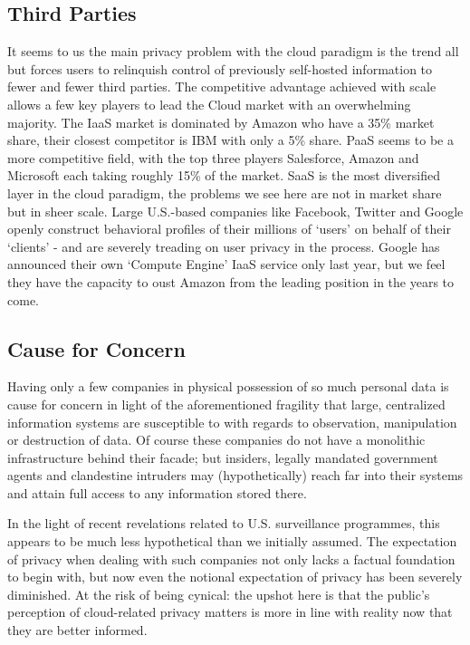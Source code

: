 \documentclass[12pt]{article}
\begin{document}
\subsection{Third Parties}
It seems to us the main privacy problem with the cloud paradigm is the trend all but forces users to relinquish control of previously self-hosted information to fewer and fewer third parties.
The competitive advantage achieved with scale allows a few key players to lead the Cloud market with an overwhelming majority.
The IaaS market is dominated by Amazon who have a 35\% market share, their closest competitor is IBM with only a 5\% share.
PaaS seems to be a more competitive field, with the top three players Salesforce, Amazon and Microsoft each taking roughly 15\% of the market.
SaaS is the most diversified layer in the cloud paradigm, the problems we see here are not in market share but in sheer scale.
Large U.S.-based companies like Facebook, Twitter and Google openly construct behavioral profiles of their millions of `users' on behalf of their `clients' - and are severely treading on user privacy in the process.
Google has announced their own `Compute Engine' IaaS service only last year, but we feel they have the capacity to oust Amazon from the leading position in the years to come.

\subsection{Cause for Concern}
Having only a few companies in physical possession of so much personal data is cause for concern in light of the aforementioned fragility that large, centralized information systems are susceptible to with regards to observation, manipulation or destruction of data.
Of course these companies do not have a monolithic infrastructure behind their facade; but insiders, legally mandated government agents and clandestine intruders may (hypothetically) reach far into their systems and attain full access to any information stored there.

In the light of recent revelations related to U.S. surveillance programmes, this appears to be much less hypothetical than we initially assumed.
The expectation of privacy when dealing with such companies not only lacks a factual foundation to begin with, but now even the notional expectation of privacy has been severely diminished.
At the risk of being cynical: the upshot here is that the public's perception of cloud-related privacy matters is more in line with reality now that they are better informed.
\end{document}
